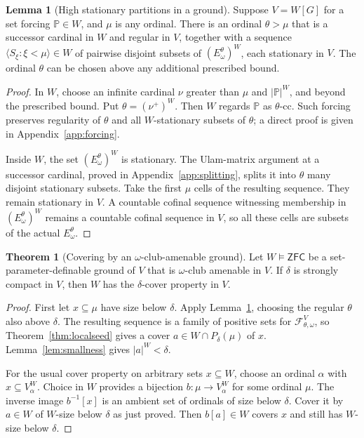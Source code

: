 \documentclass[11pt,letterpaper]{article}
\theoremstyle{definition}
\newtheorem{theorem}[definition]{Theorem}
\newtheorem{lemma}[definition]{Lemma}
\numberwithin{equation}{section}
\newcommand{\ZFC}{\mathsf{ZFC}}
\newcommand{\PP}{\mathbb P}
\newcommand{\calF}{\mathcal F}
\begin{document}
\begin{lemma}[High stationary partitions in a ground]\label{lem:groundpartition}
Suppose $V=W[G]$ for a set forcing $\PP\in W$, and $\mu$ is any
ordinal. There is an ordinal $\theta>\mu$ that is a successor cardinal
in $W$ and regular in $V$, together with a sequence
$\langle S_\xi:\xi<\mu\rangle\in W$ of pairwise disjoint subsets of
$(E^\theta_\omega)^W$, each stationary in $V$. The ordinal $\theta$
can be chosen above any additional prescribed bound.
\end{lemma}
\begin{proof}
In $W$, choose an infinite cardinal $\nu$ greater than $\mu$ and
$|\PP|^W$, and beyond the prescribed bound. Put $\theta=(\nu^+)^W$.
Then $W$ regards $\PP$ as $\theta$-cc. Such forcing preserves
regularity of $\theta$ and all $W$-stationary subsets of $\theta$;
a direct proof is given in Appendix~\ref{app:forcing}.

Inside $W$, the set $(E^\theta_\omega)^W$ is stationary. The Ulam-matrix
argument at a successor cardinal, proved in
Appendix~\ref{app:splitting}, splits it into $\theta$ many disjoint
stationary subsets. Take the first $\mu$ cells of the resulting
sequence. They remain stationary in $V$. A countable cofinal sequence
witnessing membership in $(E^\theta_\omega)^W$ remains a countable
cofinal sequence in $V$, so all these cells are subsets of the actual
$E^\theta_\omega$.
\end{proof}

\begin{theorem}[Covering by an $\omega$-club-amenable ground]\label{thm:groundcover}
Let $W\models\ZFC$ be a set-parameter-definable ground of $V$ that is
$\omega$-club amenable in $V$. If $\delta$ is strongly compact in $V$,
then $W$ has the $\delta$-cover property in $V$.
\end{theorem}
\begin{proof}
First let $x\subseteq\mu$ have size below $\delta$. Apply
Lemma~\ref{lem:groundpartition}, choosing the regular $\theta$ also
above $\delta$. The resulting sequence is a family of positive sets
for $\calF^V_{\theta,\omega}$, so
Theorem~\ref{thm:localseed} gives a cover $a\in W\cap P_\delta(\mu)$
of $x$. Lemma~\ref{lem:smallness} gives $|a|^W<\delta$.

For the usual cover property on arbitrary sets $x\subseteq W$, choose
an ordinal $\alpha$ with $x\subseteq V_\alpha^W$. Choice in $W$
provides a bijection $b:\mu\to V_\alpha^W$ for some ordinal $\mu$.
The inverse image $b^{-1}[x]$ is an ambient set of ordinals of size
below $\delta$. Cover it by $a\in W$ of $W$-size below $\delta$ as
just proved. Then $b[a]\in W$ covers $x$ and still has $W$-size below
$\delta$.
\end{proof}
\end{document}
